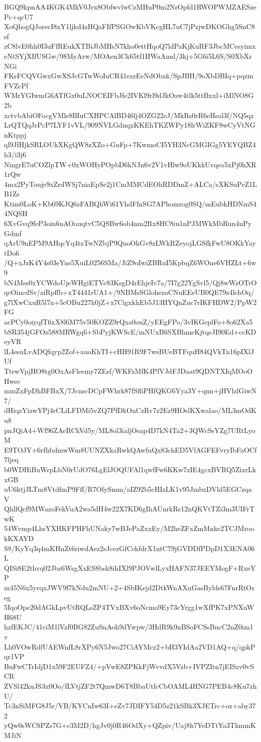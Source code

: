 BGQ9kpnAA4KGK4MkV0Jrx8ObfwvlwCzMHuP0m2NrOpfd1RWOPWMZAESzePc+qcU7
XoQhogQJorecI8xY1ljkd4zHQaFIfPSGOwKbVKcgHL7uC7jPzjwDKOGhg5SnC8sf
zC8lvE0hh0I3uFfREukXTBiJbMHsN7kho0ettHqoQ7ldPaKjKuRF3JbcMCesyimx
eNtSYjXIfUSGw/98MyArw/MOAen3Ck65tf1HWaAmd/3kj+5G6i5L6S/S0XbXrNGi
FKrFCQVGwxGwXSJcGTwWoIuCR41ezzEeNdObxk/SpJBH/9oXbDBIq+pqzmFVZcPf
WMrYGIwmG6ATfGx0uLNOCEIFbJfe2IVKl9rl9dJkOaw4tlk5ttBxxl+iMlNO8G2b
xctvbAbiOFocgVMls8BIuCXHPCAlBD46lj4OZG22eJ/MkRs0rR6eHsal3f/NQ5qz
LrQTQqJrPcP7LYF1vVL/909NVLGdnqxKKEhTKZWPy18lrWiZKF8wCyVtNGnKtppj
ql9JfHjkSRLOUkXKgQW8zXZo+GuFp+7KwmoCI5YH3NcGMGIGg5YEYQBZ4h3/i3j6
NingrE7uCOZlpTW+0xWOHyPOpbD6kNJn6v2V1vHlw9oUKkkUvqea5xPj0hXR1rQw
4mx2PyTouje9xZrdWSj7niaEpSe2j1CmMMCdEOhRDDmZ+ALCa/sXKSuPeZ1LB1Zs
Ktim0LoK+Kb69KJQ6zFABQhWi61YhdFfnSG7APhomrog0SQ/mEubkHDNmS44NQSH
6XvGvq9feP3oin6uAOauqtvC5QSBw6ob4nm2Rx8HC8iu1nPJMWkMbRun4uPyGdmf
qArU9nEPM9AHqcYq4tzTwNZbjP9QuoOhGv8zLWkRZeyojLGSfkFwU8OKkYaytDo6
/Q+xJzK4Y4s03eYns5XuiL0256SMa/JiZ9oIwiZBRuI5KpbqZ6WOne6VHZLt+6w9
bN4Mss0xYCWdoUjeWHgiETVc83KsgD4rEhjeIv7a/7I7g22YgSvl5/Qj8wWzOTrO
qcOincdSv/ziRpffb+xT4441rUA1+/9NBMsSGlohezoCNuEEeUB0QE79z4lchOq/
g7lXwCxuR5l7n+5cOBu227h0jZ+x7CigxkhEb5J13HYQnZuc7rIKFHDW2/PpW2FG
acPCy0oiyqfT6xX8l6M75v50KOZZ9rQxa0ouZ/yEEgFPo/3vIKGeplFo+8o62Xa5
bSR354jGFOz588MRWgq6+SbPyjKWScE/mNUxB6SXBhmeKjtqeJI90Ed+ccKDeyVR
lL4esuLvADQfqyp2Zof+auoKhTI+cHH91R9F7wsBUeBTFquH84QVkTu16pIXlJUf
TtrwVpjHO8tg0OxAsFleemy7ZEsf/WKFzMfK4PfVJdFJDaat9QDNTXIqMOoOHwec
mmZxFpDhBFBxX/7JcnscDCpFWhrk87fSfliPHfQKG6Yya3Y+qnn+jHVlzlGiwN7/
dHiqzYizwYPj4rCLiLFDMi5vZQ7PfDkOnCzRv7z2Ez9HOslKXwalao/ML3mOdKu8
pnJQiA4+Wf96ZAeRCkVd5y/ML8ol3ialjOsap4D7kN4Ta2+3QWcSsYZg7URtLyoM
E9TOJY+6rfhbdmwWm8UUNZXkaRwkQAwfuQx83chED5VfAGFEFvryIbFaOCf7ljeq
b0WDHiBuWrpLbN0rUdO76LgElJOQUFAl1qwfFw6KKw7zIE4gcxBVRQ5ZixrLkxGB
uU6ktjJLTm8VtdfmP9Fff/R7OfySmm/aIZ92b5cHIzLK1v95JmbxDVld5EGCzqaV
QhllQcf9MWazoFekVuA2wa5dH4w22X7KD6gIhAUnrkRs12nQKVtTZi3m3UIFrTwK
54Wvmp4LhsYXHKFPHFhUNaky7wBJePaZxxEy/M2heZFxZmMnke2TCJMrookKXAYD
S8/KyYq3q4mKHnZt6riwdAez2sJcezGfCckfdrX1ntC79jGVDDfPDpD1X3ENA06L
QISi8E2thvq02Jbz6WsgXxES8bsk8ihIXl9PJOVwlLyxHAFN37JEEYMogF+RxeYP
m45N6x5yrqxJWV9f7kNdu2mNU+2+4SbIKejd2DtkWnAXnGasBylds67FnrRtOzeg
5IqoOpe20dAGkLpvUtRQLsZP4TVxBXv6oNcmo9Ey73cYrgg1wXfPK7xPNXnWH68U
hzfEKJC/41ciM1lVzf0BG82ZuSnAoh9dYwpw/3HdR9k9nBSoFCSsBncC2nZ0im1v
Lh0VOwRdfUAEWnfL8rXPy6N5Jwo27CiAYMcz2+bH3YIdAa2VD1AQ+q/qpkPqr1VP
BuFwCTrIdjD1x59F2EUFZ4/+pVwE8ZPKkFjWvvdX5Vzb+IVPZItn7jEISzv0vSCR
ZVSl42kuJS3x0Oo/fLVtjZF2t7QmwD6T8BbaUtfcCbOAML4HNG7PEB4c8Ku7zhU/
Tc3nSiMFG8J5r/VB/KYCnIw63I+eZv7JDIFY54D5z21kSBk3XJETrc+oz+aby372
yQw0sWCSPZs7G+c3M2D/hgJv0j0R46OdXy+QZpiv/Uaj8h7YeDTtYa3TkmmKMJiN
